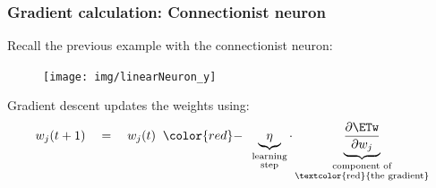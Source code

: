 \begin{frame}\frametitle{Gradient calculation: Connectionist neuron}
    
    Recall the previous example with the connectionist neuron:
    
    \begin{figure}[h]
        \centering
        \texttt{[image: img/linearNeuron\_y]}
        \label{fig:neuron} 
    \end{figure}
    
    Gradient descent updates the weights using:
    \begin{equation}
    		w_{j}(t+1) \quad=\quad w_{j}(t) 
				\;\;{\color{red}-}\;\;
				\underbrace{{\eta}}_{ 
						\substack{\text{learning} \\ \text{step} } }
                        \cdot
				\underbrace{\frac{\partial \ETw}{
					\partial {w}_{j}}}_{
						\substack{
							\text{component of}\\
							\text{\textcolor{red}{the gradient}} 
			} }
    \end{equation}
    
\end{frame}
